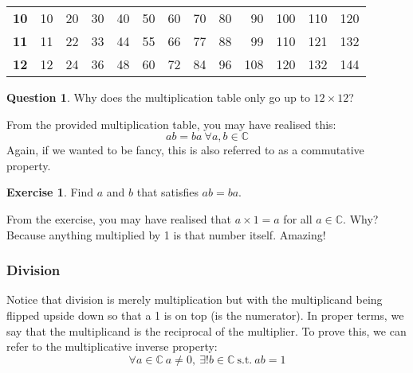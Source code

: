 \documentclass[a4paper]{article}
\theoremstyle{plain}
\theoremstyle{definition}
\newtheorem{question}{Question}[section]
\newtheorem{exercise}{Exercise}[section]
\theoremstyle{remark}
\newcommand{\subsectionSpace}{\vspace{0.5em}}
\begin{document}
\begin{table}[H]
\begin{tabular}{r|rrrrrrrrrrrr}
            \textbf{10} & 10         & 20         & 30         & 40         & 50         & 60         & 70         & 80         & 90         & 100         & 110         & 120         \\
            \textbf{11} & 11         & 22         & 33         & 44         & 55         & 66         & 77         & 88         & 99         & 110         & 121         & 132         \\
            \textbf{12} & 12         & 24         & 36         & 48         & 60         & 72         & 84         & 96         & 108        & 120         & 132         & 144        
            \end{tabular}
        \end{table}

        \begin{question}
            Why does the multiplication table only go up to $12\times 12$?
        \end{question}

        From the provided multiplication table, you may have realised this:
        $$ab = ba \ \forall a, b \in \mathbb{C}$$
        Again, if we wanted to be fancy, this is also referred to as a commutative property.

        \begin{exercise}
            Find $a$ and $b$ that satisfies $ab=ba$.
        \end{exercise}

        From the exercise, you may have realised that $a\times 1 = a$ for all $a\in \mathbb{C}$. Why? Because anything multiplied by 1 is that number itself. Amazing!

        \subsubsection{Division}
        Notice that division is merely multiplication but with the multiplicand being flipped upside down so that a 1 is on top (is the numerator). In proper terms, we say that the multiplicand is the reciprocal of the multiplier. To prove this, we can refer to the multiplicative inverse property:
        $$\forall a \in \mathbb{C} \ a\neq 0, \ \exists !b \in \mathbb{C} \ \mathrm{s.t.} \ ab=1$$


        \subsectionSpace
\end{document}
